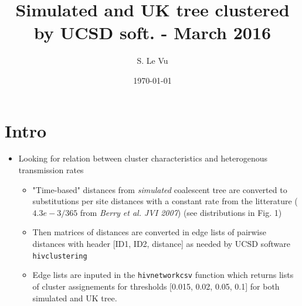\documentclass[]{revtex4}\usepackage[]{graphicx}\usepackage[]{color}
\begin{document}
\title{Simulated and UK tree clustered by UCSD soft. - March 2016}
\author{S. Le Vu}
\date{\today}

\maketitle





\section{Intro}
\begin{itemize}
\item Looking for relation between cluster characteristics and heterogenous transmission rates

\begin{itemize}
\item "Time-based" distances from \emph{simulated} coalescent tree are converted to substitutions per site distances with a constant rate from the litterature ($4.3e-3/365$ from \emph{Berry et al. JVI 2007}) (see distributions in Fig. 1)
\item Then matrices of distances are converted in edge lists of pairwise distances with header [ID1, ID2, distance] as needed by UCSD software \texttt{hivclustering}
\item Edge lists are inputed in the \texttt{hivnetworkcsv} function which returns lists of cluster assignements for thresholds [0.015, 0.02, 0.05, 0.1] for both simulated and UK tree.
\end{itemize}

\end{itemize}
\end{document}
